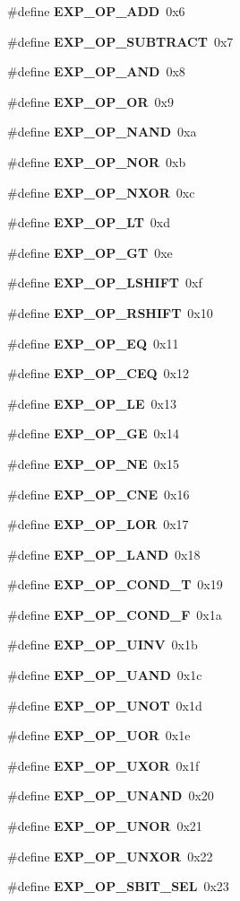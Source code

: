 \begin{CompactItemize}
\item 
\#define {\bf EXP\_\-OP\_\-ADD}\ 0x6
\item 
\#define {\bf EXP\_\-OP\_\-SUBTRACT}\ 0x7
\item 
\#define {\bf EXP\_\-OP\_\-AND}\ 0x8
\item 
\#define {\bf EXP\_\-OP\_\-OR}\ 0x9
\item 
\#define {\bf EXP\_\-OP\_\-NAND}\ 0xa
\item 
\#define {\bf EXP\_\-OP\_\-NOR}\ 0xb
\item 
\#define {\bf EXP\_\-OP\_\-NXOR}\ 0xc
\item 
\#define {\bf EXP\_\-OP\_\-LT}\ 0xd
\item 
\#define {\bf EXP\_\-OP\_\-GT}\ 0xe
\item 
\#define {\bf EXP\_\-OP\_\-LSHIFT}\ 0xf
\item 
\#define {\bf EXP\_\-OP\_\-RSHIFT}\ 0x10
\item 
\#define {\bf EXP\_\-OP\_\-EQ}\ 0x11
\item 
\#define {\bf EXP\_\-OP\_\-CEQ}\ 0x12
\item 
\#define {\bf EXP\_\-OP\_\-LE}\ 0x13
\item 
\#define {\bf EXP\_\-OP\_\-GE}\ 0x14
\item 
\#define {\bf EXP\_\-OP\_\-NE}\ 0x15
\item 
\#define {\bf EXP\_\-OP\_\-CNE}\ 0x16
\item 
\#define {\bf EXP\_\-OP\_\-LOR}\ 0x17
\item 
\#define {\bf EXP\_\-OP\_\-LAND}\ 0x18
\item 
\#define {\bf EXP\_\-OP\_\-COND\_\-T}\ 0x19
\item 
\#define {\bf EXP\_\-OP\_\-COND\_\-F}\ 0x1a
\item 
\#define {\bf EXP\_\-OP\_\-UINV}\ 0x1b
\item 
\#define {\bf EXP\_\-OP\_\-UAND}\ 0x1c
\item 
\#define {\bf EXP\_\-OP\_\-UNOT}\ 0x1d
\item 
\#define {\bf EXP\_\-OP\_\-UOR}\ 0x1e
\item 
\#define {\bf EXP\_\-OP\_\-UXOR}\ 0x1f
\item 
\#define {\bf EXP\_\-OP\_\-UNAND}\ 0x20
\item 
\#define {\bf EXP\_\-OP\_\-UNOR}\ 0x21
\item 
\#define {\bf EXP\_\-OP\_\-UNXOR}\ 0x22
\item 
\#define {\bf EXP\_\-OP\_\-SBIT\_\-SEL}\ 0x23
\item 

\end{CompactItemize}
